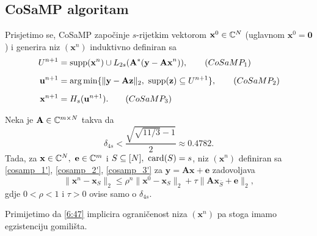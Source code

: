 \documentclass[a4paper,twoside,12pt]{memoir} %
\newcommand{\vect}[1]{\mathbf{#1}}
\renewcommand{\vec}{\vect}
\newcommand{\card}{\text{\normalfont{card}}}
\newcommand{\supp}{\text{\normalfont{supp}}}
\newcommand{\norm}[1]{\|{#1}\|}
\DeclareMathOperator*{\argmin}{arg\,min}
\begin{document}
\subsection[CoSaMP algoritam][CoSaMP algoritam]{CoSaMP algoritam}
Prisjetimo se, CoSaMP zapo\v{c}inje $s$-rijetkim vektorom $\vec x^0 \in \C^N$ (uglavnom $\vec x^0 = \vec 0$) i generira niz $(\vec x^n)$ induktivno definiran sa
\begin{align}
    U^{n+1} & = \supp(\vec x^n) \cup L_{2s}(\vec A^*(\vec y - \vec {Ax}^n)),\tag{$CoSaMP_1$}\label{cosamp_1'}\\[0.5em]
    \vec u^{n+1} &= \argmin \{\norm{\vec y - \vec {Az}}_2,\ \supp(\vec z) \subseteq U^{n+1}\},\tag{$CoSaMP_2$}\label{cosamp_2'}\\[0.5em]
    \vec x^{n+1} &= H_s(\vec u ^{n+1}).\tag{$CoSaMP_3$}\label{cosamp_3'}
\end{align}
\begin{thm}\label{tm:6:27}
    Neka je $\vec A \in \C^{m \times N}$ takva da
    \begin{equation}\label{6:46}
        \delta_{4s} < \frac{\sqrt{\sqrt{11/3}-1}}{2} \approx 0.4782.  
    \end{equation}
    Tada, za $\vec x \in \C^N,\ \vec e \in \C^m$ i $S \subseteq [N],\ \card(S)=s$, niz $(\vec x^n)$ definiran sa \eqref{cosamp_1'}, \eqref{cosamp_2'}, \eqref{cosamp_3'} za $\vec y = \vec{Ax} + \vec e$ zadovoljava
    \begin{equation}\label{6:47}
        \norm{\vec x^n - \vec x_S}_2 \leq \rho^n \norm{\vec x^0 - \vec x_S}_2 + \tau \norm{\vec{Ax}_{\bar S} + \vec e}_2,
    \end{equation}
    gdje $0<\rho<1$ i $\tau > 0$ ovise samo o $\delta_{4s}$.
\end{thm}

Primijetimo da \eqref{6:47} implicira ograni\v{c}enost niza $(\vec x^n)$ pa stoga imamo egzistenciju gomili\v{s}ta.
\end{document}
